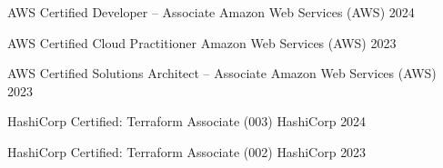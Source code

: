 

\begin{cvhonors}

  \cvhonor
  {AWS Certified Developer – Associate} %
  {Amazon Web Services (AWS)} %
  {} %
  {2024} %

  \cvhonor
  {AWS Certified Cloud Practitioner} %
  {Amazon Web Services (AWS)} %
  {} %
  {2023} %

  \cvhonor
  {AWS Certified Solutions Architect – Associate} %
  {Amazon Web Services (AWS)} %
  {} %
  {2023} %

  \cvhonor
  {HashiCorp Certified: Terraform Associate (003)} %
  {HashiCorp} %
  {} %
  {2024} %

  \cvhonor
  {HashiCorp Certified: Terraform Associate (002)} %
  {HashiCorp} %
  {} %
  {2023} %

\end{cvhonors}
